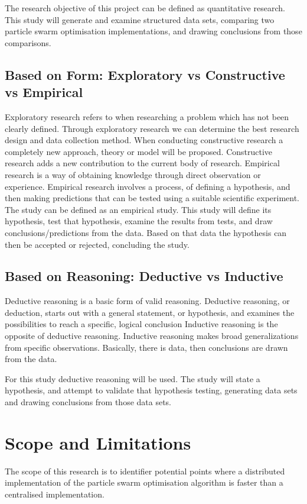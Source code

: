 \documentclass[oneside,12pt]{book}
\begin{document}
The research objective of this project can be defined as quantitative research. This study will generate and examine structured data sets, comparing two particle swarm optimisation implementations, and drawing conclusions from those comparisons. 
\subsection{Based on Form: Exploratory vs Constructive vs Empirical}
Exploratory research refers to when researching a problem which has not been clearly defined. Through exploratory research we can determine the best research design and data collection method. 
When conducting constructive research a completely new approach, theory or model will be proposed. Constructive research adds a new contribution to the current body of research. 
Empirical research is a way of obtaining knowledge through direct observation or experience. Empirical research involves a process, of defining a hypothesis, and then making predictions that can be tested using a suitable scientific experiment. The study can be defined as an empirical study. This study will define its hypothesis, test that hypothesis, examine the results from tests, and draw conclusions/predictions from the data. Based on that data the hypothesis can then be accepted or rejected, concluding the study.  

\subsection{Based on Reasoning: Deductive vs Inductive}
Deductive reasoning is a basic form of valid reasoning. Deductive reasoning, or deduction, starts out with a general statement, or hypothesis, and examines the possibilities to reach a specific, logical conclusion
Inductive reasoning is the opposite of deductive reasoning. Inductive reasoning makes broad generalizations from specific observations. Basically, there is data, then conclusions are drawn from the data. 

For this study deductive reasoning will be used. The study will state a hypothesis, and attempt to validate that hypothesis testing, generating data sets and drawing conclusions from those data sets. 

\section{Scope and Limitations}
The scope of this research is to identifier potential points where a distributed implementation of the particle swarm optimisation algorithm is faster than a centralised implementation. 
\end{document}
